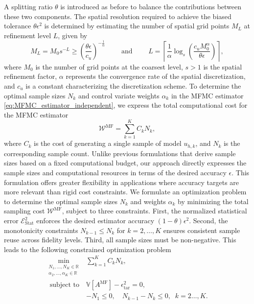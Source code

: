 A splitting ratio $\theta$ is introduced as before to balance the contributions between these two components. The spatial resolution required to achieve the biased tolerance $\theta \epsilon^2$ is determined by estimating the number of spatial grid points $M_L$ at refinement level $L$, given by
%
\begin{equation}
    \label{eq:SLSGC_MLS_SpatialGridsNo}
    M_L = M_0s^{-L} \ge \left(\frac{\theta\epsilon}{c_u}\right)^{-\frac 1 {\alpha}} \qquad \text{ and } \qquad     L = \left\lceil \frac{1}{\alpha}\log_s \left(\frac{c_u M_0^\alpha}{\theta\epsilon}\right) \right\rceil,
\end{equation}
%
where $M_0$ is the number of grid points at the coarsest level, $s>1$ is the spatial refinement factor, $\alpha$ represents the convergence rate of the spatial discretization, and $c_u$ is a constant characterizing the discretization scheme. To determine the optimal sample sizes $N_k$ and control variate weights $\alpha_k$ in the MFMC estimator \eqref{eq:MFMC_estimator_independent}, we express the total computational cost for the MFMC estimator
%
\[
\mathcal{W}^{\text{MF}} = \sum_{k=1}^K C_kN_k,
\]
%
where $C_k$ is the cost of generating a single sample of model $u_{h,k}$, and $N_k$ is the corresponding sample count. Unlike previous formulations \cite{PeWiGu:2016} that derive sample sizes based on a fixed computational budget, our approach directly expresses the sample sizes and computational resources in terms of the desired accuracy $\epsilon$. This formulation offers greater flexibility in applications where accuracy targets are more relevant than rigid cost constraints. We formulate an optimization problem to determine the optimal sample sizes $N_k$ and weights $\alpha_k$ by minimizing the total sampling cost $\mathcal{W}^{\text{MF}}$, subject to three constraints. First, the normalized statistical error $\mathcal{E}_{\text{Stat}}^2$ enforces the desired estimator accuracy $(1-\theta)\epsilon^2$. Second,  the monotonicity constraints $N_{k-1}\le N_k$ for $k=2,\ldots, K$ ensures consistent sample reuse across fidelity levels. Third, all sample sizes must be non-negative. This leads to the following constrained optimization problem
%
\begin{equation}\label{eq:Optimization_pb_sample_size}
    \begin{array}{ll}
    \min \limits_{\begin{array}{c}\scriptstyle N_1,\ldots, N_K\in \mathbb{R} \\[-4pt]
\scriptstyle \alpha_2,\ldots,\alpha_K\in \mathbb{R}
\end{array}} &\displaystyle\sum\limits_{k=1}^K C_kN_k,\\
       \;\,\text{subject to} &\mathbb{V}\left[A^{\text{MF}}\right]- \epsilon_{\text{tar}}^2 = 0,\\[2pt]
       &\displaystyle -N_1\le 0,\quad \displaystyle N_{k-1}-N_k\le 0, \;\; k=2\ldots,K.
    \end{array}
\end{equation}
